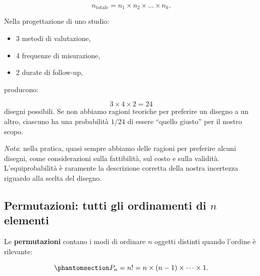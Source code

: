\documentclass[
  italian,
  letterpaper,
  a4paper,
  11pt,
  open=any]{scrbook}
\providecommand{\tightlist}{%
  \setlength{\itemsep}{0pt}\setlength{\parskip}{0pt}}
\theoremstyle{plain}
\theoremstyle{definition}
\theoremstyle{definition}
\theoremstyle{remark}
\begin{document}
\[
n_{\text{totale}} = n_1 \times n_2 \times \dots \times n_k.
\]

\begin{tcolorbox}[enhanced jigsaw, arc=.35mm, bottomrule=.15mm, bottomtitle=1mm, breakable, colback=white, colbacktitle=quarto-callout-note-color!10!white, colframe=quarto-callout-note-color-frame, coltitle=black, left=2mm, leftrule=.75mm, opacityback=0, opacitybacktitle=0.6, rightrule=.15mm, title=\textcolor{quarto-callout-note-color}{\faInfo}\hspace{0.5em}{Esempio psicologico}, titlerule=0mm, toprule=.15mm, toptitle=1mm]

Nella progettazione di uno studio:

\begin{itemize}
\tightlist
\item
  3 metodi di valutazione,
\item
  4 frequenze di misurazione,
\item
  2 durate di follow-up,
\end{itemize}

producono:

\[
3 \times 4 \times 2 = 24
\] disegni possibili. Se non abbiamo ragioni teoriche per preferire un
disegno a un altro, ciascuno ha una probabilità \(1/24\) di essere
``quello giusto'' per il nostro scopo.

\emph{Nota}: nella pratica, quasi sempre abbiamo delle ragioni per
preferire alcuni disegni, come considerazioni sulla fattibilità, sul
costo e sulla validità. L'equiprobabilità è raramente la descrizione
corretta della nostra incertezza riguardo alla scelta del disegno.

\end{tcolorbox}

\subsection{\texorpdfstring{Permutazioni: tutti gli ordinamenti di \(n\)
elementi}{Permutazioni: tutti gli ordinamenti di n elementi}}\label{permutazioni-tutti-gli-ordinamenti-di-n-elementi}

Le \textbf{permutazioni} contano i modi di ordinare \(n\) oggetti
distinti quando l'ordine è rilevante:

\begin{equation}\protect\phantomsection\label{eq-permutations-def}{
P_n = n! = n \times (n-1) \times \cdots \times 1.
}\end{equation}
\end{document}
